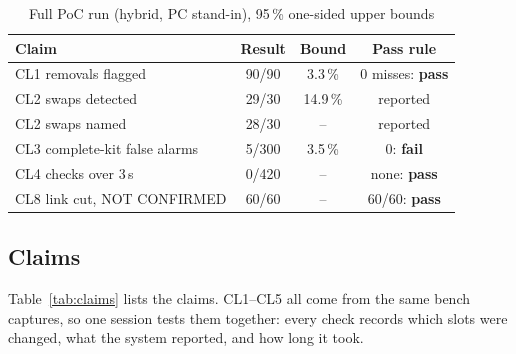 \begin{table}[!t]
\centering
\footnotesize
\caption{Full PoC run (hybrid, PC stand-in), 95\,\% one-sided upper bounds}
\label{tab:poc}
\begin{tabular}{@{}lccc@{}}
\toprule
Claim & Result & Bound & Pass rule \\
\midrule
CL1 removals flagged   & 90/90 & 3.3\,\% & 0 misses: \textbf{pass} \\
CL2 swaps detected     & 29/30 & 14.9\,\% & reported \\
CL2 swaps named        & 28/30 & -- & reported \\
CL3 complete-kit false alarms & 5/300 & 3.5\,\% & 0: \textbf{fail} \\
CL4 checks over 3\,s   & 0/420 & -- & none: \textbf{pass} \\
CL8 link cut, NOT CONFIRMED & 60/60 & -- & 60/60: \textbf{pass} \\
\bottomrule
\end{tabular}
\end{table}

\subsection{Claims}
Table~\ref{tab:claims} lists the claims. CL1--CL5 all come from the same bench
captures, so one session tests them together: every check records which
slots were changed, what the system reported, and how long it took.

